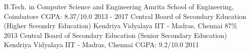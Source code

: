 \begin{cventries}
  \cventry
    {B.Tech. in Computer Science and Engineering}
    {Amrita School of Engineering, Coimbatore}
    {CGPA: 8.37/10.0}
    {2013 - 2017}
    {\empty}
  \cventry
    {Central Board of Secondary Education (Higher Sceondry Education)}
    {Kendriya Vidyalaya IIT - Madras, Chennai}
    {87\%}
    {2013}
    {\empty}
  \cventry
    {Central Board of Secondary Education (Senior Secondary Education)}
    {Kendriya Vidyalaya IIT - Madras, Chennai}
    {CGPA: 9.2/10.0}
    {2011}
    {\empty}
\end{cventries}

